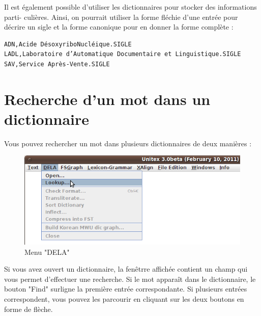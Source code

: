 Il est également possible d’utiliser les dictionnaires pour stocker des informations parti-
culières. Ainsi, on pourrait utiliser la forme fléchie d’une entrée pour décrire un sigle et la
forme canonique pour en donner la forme complète :

\bigskip
\begin{verbatim}
ADN,Acide DésoxyriboNucléique.SIGLE
LADL,Laboratoire d’Automatique Documentaire et Linguistique.SIGLE
SAV,Service Après-Vente.SIGLE
\end{verbatim}



\section{Recherche d'un mot dans un dictionnaire}
\label{section-dictionary-lookup}
Vous pouvez rechercher un mot dans plusieurs dictionnaires de deux manières : 

\begin{figure}[h!]
\begin{center}
\includegraphics[width=13cm]{resources/img/fig3-1.png}
\caption{Menu "DELA"}
\end{center}
\end{figure}

\bigskip
\noindent
Si vous avez ouvert un dictionnaire, la fenêtrre affichée contient un champ qui vous permet
d'effectuer une recherche. Si le mot apparaît dans le dictionnaire, le bouton "Find" surligne la
première entrée correspondante. Si plusieurs entrées correspondent, vous pouvez les parcourir en
cliquant sur les deux boutons en forme de flèche.

